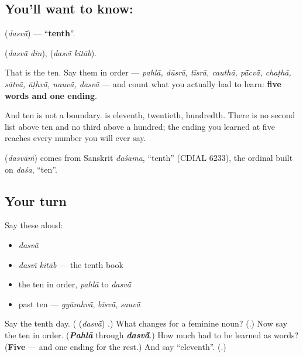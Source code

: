 \subsection*{You'll want to know: }
\textbf{} (\emph{dasvā̃}) — \textquotedblleft{}\textbf{tenth}\textquotedblright{}.

\textbf{ } (\emph{dasvā̃ din}), \textbf{ } (\emph{dasvī̃ kitāb}).

That is the ten. Say them in order — \emph{pahlā, dūsrā, tīsrā, cauthā, pā̃cvā̃, chaṭhā, sātvā̃, āṭhvā̃, nauvā̃, dasvā̃} — and count what you actually had to learn: \textbf{five words and one ending}.

And ten is not a boundary. \textbf{} is eleventh, \textbf{} twentieth, \textbf{} hundredth. There is no second list above ten and no third above a hundred; the ending you learned at five reaches every number you will ever say.

\begin{cousinweb}
\textbf{} (\emph{dasvāṁ}) comes from Sanskrit \emph{daśama}, \textquotedblleft{}tenth\textquotedblright{} (CDIAL 6233), the ordinal built on \emph{daśa}, \textquotedblleft{}ten\textquotedblright{}.
\end{cousinweb}

\subsection*{Your turn}
Say these aloud:

\begin{itemize}
\raggedright
  \item \emph{dasvā̃}
  \item \emph{dasvī̃ kitāb} — the tenth book
  \item the ten in order, \emph{pahlā} to \emph{dasvā̃}
  \item past ten — \emph{gyārahvā̃}, \emph{bīsvā̃}, \emph{sauvā̃}
\end{itemize}

\begin{tcolorbox}[breakable,colback=teal!4,colframe=teal!35!black,title={Before you move on}]
Say the tenth day. (\textbf{} (\emph{dasvā̃}) \textbf{}.) What changes for a feminine noun? (\textbf{}.) Now say the ten in order. (\emph{\textbf{Pahlā}} through \emph{\textbf{dasvā̃}}.) How much had to be learned as words? (\textbf{Five} — and one ending for the rest.) And say \textquotedblleft{}eleventh\textquotedblright{}. (\textbf{}.)
\end{tcolorbox}

